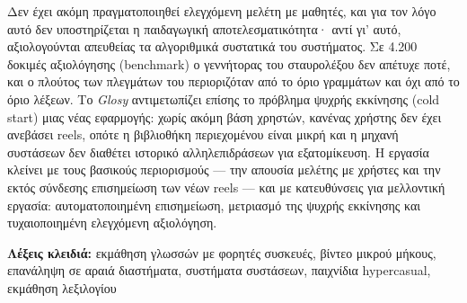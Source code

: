Δεν έχει ακόμη πραγματοποιηθεί ελεγχόμενη μελέτη με μαθητές, και για τον λόγο αυτό δεν υποστηρίζεται η παιδαγωγική αποτελεσματικότητα· αντί γι' αυτό, αξιολογούνται απευθείας τα αλγοριθμικά συστατικά του συστήματος. Σε 4.200 δοκιμές αξιολόγησης (benchmark) ο γεννήτορας του σταυρολέξου δεν απέτυχε ποτέ, και ο πλούτος των πλεγμάτων του περιοριζόταν από το όριο γραμμάτων και όχι από το όριο λέξεων. Το \textit{Glosy} αντιμετωπίζει επίσης το πρόβλημα ψυχρής εκκίνησης (cold start) μιας νέας εφαρμογής: χωρίς ακόμη βάση χρηστών, κανένας χρήστης δεν έχει ανεβάσει reels, οπότε η βιβλιοθήκη περιεχομένου είναι μικρή και η μηχανή συστάσεων δεν διαθέτει ιστορικό αλληλεπιδράσεων για εξατομίκευση. Η εργασία κλείνει με τους βασικούς περιορισμούς --- την απουσία μελέτης με χρήστες και την εκτός σύνδεσης επισημείωση των νέων reels --- και με κατευθύνσεις για μελλοντική εργασία: αυτοματοποιημένη επισημείωση, μετριασμό της ψυχρής εκκίνησης και τυχαιοποιημένη ελεγχόμενη αξιολόγηση.

\textbf{Λέξεις κλειδιά:} εκμάθηση γλωσσών με φορητές συσκευές, βίντεο μικρού μήκους, επανάληψη σε αραιά διαστήματα, συστήματα συστάσεων, παιχνίδια hypercasual, εκμάθηση λεξιλογίου
